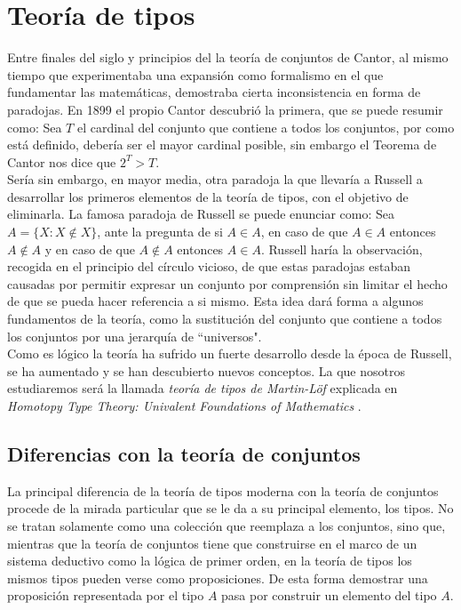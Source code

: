 \chapter{Teoría de tipos}
\label{sect:tt}

Entre finales del siglo  y principios del  la teoría de conjuntos de Cantor, al mismo tiempo que experimentaba una expansión como formalismo en el que fundamentar las matemáticas, demostraba cierta inconsistencia en forma de paradojas. En 1899 el propio Cantor descubrió la primera, que se puede resumir como: Sea $T$ el cardinal del conjunto que contiene a todos los conjuntos, por como está definido, debería ser el mayor cardinal posible, sin embargo el Teorema de Cantor nos dice que $2^T > T$.\\

Sería sin embargo, en mayor media, otra paradoja la que llevaría a Russell a desarrollar los primeros elementos de la teoría de tipos, con el objetivo de eliminarla. La famosa paradoja de Russell se puede enunciar como: Sea $A = \{X : X \notin X\}$, ante la pregunta de si $A \in A$, en caso de que $A \in A$ entonces $A \notin A$ y en caso de que $A \notin A$ entonces $A \in A$. Russell haría la observación, recogida en el principio del círculo vicioso, de que estas paradojas estaban causadas por permitir expresar un conjunto por comprensión sin limitar el hecho de que se pueda hacer referencia a si mismo. Esta idea dará forma a algunos fundamentos de la teoría, como la sustitución del conjunto que contiene a todos los conjuntos por una jerarquía de ``universos".\\

Como es lógico la teoría ha sufrido un fuerte desarrollo desde la época de Russell, se ha aumentado y se han descubierto nuevos conceptos. La que nosotros estudiaremos será la llamada \textit{teoría de tipos de Martin-Löf} explicada en \textit{Homotopy Type Theory: Univalent Foundations of Mathematics} \cite{hottbook}.\\

\section{Diferencias con la teoría de conjuntos}

La principal diferencia de la teoría de tipos moderna con la teoría de conjuntos procede de la mirada particular
que se le da a su principal elemento, los tipos. No se tratan solamente como una colección que reemplaza a los conjuntos, sino que, mientras que la teoría de conjuntos tiene que construirse en el marco de un sistema deductivo como la lógica de primer orden, en la teoría de tipos los mismos tipos pueden verse como proposiciones. De esta forma demostrar una proposición representada por el tipo $A$ pasa por construir un elemento del tipo $A$.\\

